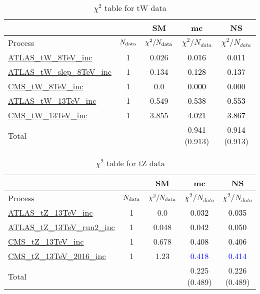 \documentclass{article}
\begin{document}
\begin{table}[H]
\centering
\begin{tabular}{|l|c|c|c|c|}
\hline
 \multicolumn{2}{|c|}{} & SM& mc& NS\\ \hline
Process & $N_{\rm data}$ & $\chi^ 2/N_{\rm data}$& $\chi^ 2/N_{data}$& $\chi^ 2/N_{data}$\\ \hline
\href{https://arxiv.org/abs/1510.03752}{ATLAS_tW_8TeV_inc} & 1 & 0.026 & \textcolor{black}{0.016} & \textcolor{black}{0.011} \\ \hline
\href{https://arxiv.org/abs/2007.01554}{ATLAS_tW_slep_8TeV_inc} & 1 & 0.134 & \textcolor{black}{0.128} & \textcolor{black}{0.137} \\ \hline
\href{https://arxiv.org/abs/1401.2942}{CMS_tW_8TeV_inc} & 1 & 0.0 & \textcolor{black}{0.000} & \textcolor{black}{0.000} \\ \hline
\href{https://arxiv.org/abs/1612.07231}{ATLAS_tW_13TeV_inc} & 1 & 0.549 & \textcolor{black}{0.538} & \textcolor{black}{0.553} \\ \hline
\href{https://arxiv.org/abs/1805.07399}{CMS_tW_13TeV_inc} & 1 & 3.855 & \textcolor{black}{4.021} & \textcolor{black}{3.867} \\ \hline
\hline Total & &  & 0.941 (0.913) & 0.914 (0.913) \\ \hline
\end{tabular}
\caption{$\chi^2$ table for tW data}
\end{table}
\begin{table}[H]
\centering
\begin{tabular}{|l|c|c|c|c|}
\hline
 \multicolumn{2}{|c|}{} & SM& mc& NS\\ \hline
Process & $N_{\rm data}$ & $\chi^ 2/N_{\rm data}$& $\chi^ 2/N_{data}$& $\chi^ 2/N_{data}$\\ \hline
\href{https://arxiv.org/abs/1712.02825}{ATLAS_tZ_13TeV_inc} & 1 & 0.0 & \textcolor{black}{0.032} & \textcolor{black}{0.035} \\ \hline
\href{https://arxiv.org/abs/2002.07546}{ATLAS_tZ_13TeV_run2_inc} & 1 & 0.048 & \textcolor{black}{0.042} & \textcolor{black}{0.050} \\ \hline
\href{https://arxiv.org/abs/1712.02825}{CMS_tZ_13TeV_inc} & 1 & 0.678 & \textcolor{black}{0.408} & \textcolor{black}{0.406} \\ \hline
\href{https://arxiv.org/abs/1812.05900}{CMS_tZ_13TeV_2016_inc} & 1 & 1.23 & \textcolor{blue}{0.418} & \textcolor{blue}{0.414} \\ \hline
\hline Total & &  & 0.225 (0.489) & 0.226 (0.489) \\ \hline
\end{tabular}
\caption{$\chi^2$ table for tZ data}
\end{table}
\end{document}
